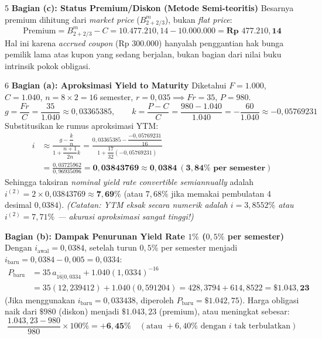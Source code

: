 \documentclass[11pt,a4paper]{article}
\newcommand{\angl}[1]{\overline{#1|}}
\begin{document}
\begin{solusibox}{5}
\textbf{Bagian (c): Status Premium/Diskon (Metode Semi-teoritis)}
Besarnya premium dihitung dari \textit{market price} ($B_{2+2/3}^m$), bukan \textit{flat price}:
\[
    \text{Premium} = B_{2+2/3}^m - C = 10.477.210{,}14 - 10.000.000 = \mathbf{\text{Rp }477.210{,}14}
\]
Hal ini karena \textit{accrued coupon} ($\text{Rp }300.000$) hanyalah penggantian hak bunga pemilik lama atas kupon yang sedang berjalan, bukan bagian dari nilai buku intrinsik pokok obligasi.
\end{solusibox}

\begin{solusibox}{6}
\textbf{Bagian (a): Aproksimasi Yield to Maturity}
Diketahui $F = 1.000$, $C = 1.040$, $n = 8 \times 2 = 16$ semester, $r = 0{,}035 \implies Fr = 35$, $P = 980$.
\[
    g = \frac{Fr}{C} = \frac{35}{1.040} \approx 0{,}03365385, \qquad k = \frac{P - C}{C} = \frac{980 - 1.040}{1.040} = -\frac{60}{1.040} \approx -0{,}05769231
\]
Substitusikan ke rumus aproksimasi YTM:
\begin{align*}
    i &\approx \frac{g - \dfrac{k}{n}}{1 + \dfrac{n+1}{2n}k} = \frac{0{,}03365385 - \dfrac{-0{,}05769231}{16}}{1 + \dfrac{17}{32}(-0{,}05769231)} \\
      &= \frac{0{,}03725962}{0{,}96935096} = \mathbf{0{,}03843769 \approx 0{,}0384 \ (3{,}84\% \text{ per semester})}
\end{align*}
Sehingga taksiran \textit{nominal yield rate convertible semiannually} adalah $i^{(2)} = 2 \times 0{,}03843769 \approx \mathbf{7{,}69\%}$ (atau $7{,}68\%$ jika memakai pembulatan 4 desimal $0{,}0384$). \textit{(Catatan: YTM eksak secara numerik adalah $i = 3{,}8552\%$ atau $i^{(2)} = 7{,}71\%$ — akurasi aproksimasi sangat tinggi!)}

\textbf{Bagian (b): Dampak Penurunan Yield Rate $1\%$ ($0{,}5\%$ per semester)}
Dengan $i_{\text{awal}} = 0{,}0384$, setelah turun $0{,}5\%$ per semester menjadi $i_{\text{baru}} = 0{,}0384 - 0{,}005 = 0{,}0334$:
\begin{align*}
    P_{\text{baru}} &= 35 \, a_{\angl{16}0{,}0334} + 1.040(1{,}0334)^{-16} \\
                    &= 35(12{,}239412) + 1.040(0{,}591204) = 428{,}3794 + 614{,}8522 = \mathbf{\$1.043{,}23}
\end{align*}
(Jika menggunakan $i_{\text{baru}} = 0{,}033438$, diperoleh $P_{\text{baru}} = \$1.042{,}75$). Harga obligasi naik dari $\$980$ (diskon) menjadi $\$1.043{,}23$ (premium), atau meningkat sebesar:
\[
    \frac{1.043{,}23 - 980}{980} \times 100\% = \mathbf{+6{,}45\%} \quad (\text{atau }+6{,}40\%\text{ dengan }i\text{ tak terbulatkan})
\]
\end{solusibox}
\end{document}
